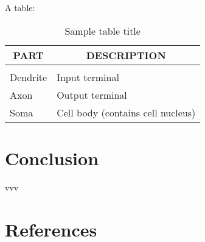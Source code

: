 \documentclass{article} %
\begin{document}
A table:

\begin{table}[t]
\caption{Sample table title}
\label{sample-table}
\begin{center}
\begin{tabular}{ll}
\multicolumn{1}{c}{\bf PART}  &\multicolumn{1}{c}{\bf DESCRIPTION}
\\ \hline \\
Dendrite         &Input terminal \\
Axon             &Output terminal \\
Soma             &Cell body (contains cell nucleus) \\
\end{tabular}
\end{center}
\end{table}

\section{Conclusion}

vvv

\section{References}



\end{document}
